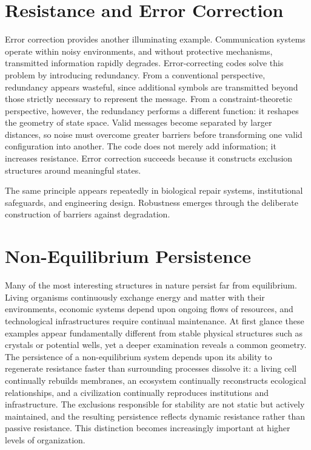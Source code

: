 \documentclass[11pt,oneside]{book}
\theoremstyle{plain}
\theoremstyle{definition}
\theoremstyle{remark}
\begin{document}
\section{Resistance and Error Correction}

Error correction provides another illuminating example. Communication systems operate within noisy environments, and without protective mechanisms, transmitted information rapidly degrades. Error-correcting codes solve this problem by introducing redundancy. From a conventional perspective, redundancy appears wasteful, since additional symbols are transmitted beyond those strictly necessary to represent the message. From a constraint-theoretic perspective, however, the redundancy performs a different function: it reshapes the geometry of state space. Valid messages become separated by larger distances, so noise must overcome greater barriers before transforming one valid configuration into another. The code does not merely add information; it increases resistance. Error correction succeeds because it constructs exclusion structures around meaningful states.

The same principle appears repeatedly in biological repair systems, institutional safeguards, and engineering design. Robustness emerges through the deliberate construction of barriers against degradation.

\section{Non-Equilibrium Persistence}

Many of the most interesting structures in nature persist far from equilibrium. Living organisms continuously exchange energy and matter with their environments, economic systems depend upon ongoing flows of resources, and technological infrastructures require continual maintenance. At first glance these examples appear fundamentally different from stable physical structures such as crystals or potential wells, yet a deeper examination reveals a common geometry. The persistence of a non-equilibrium system depends upon its ability to regenerate resistance faster than surrounding processes dissolve it: a living cell continually rebuilds membranes, an ecosystem continually reconstructs ecological relationships, and a civilization continually reproduces institutions and infrastructure. The exclusions responsible for stability are not static but actively maintained, and the resulting persistence reflects dynamic resistance rather than passive resistance. This distinction becomes increasingly important at higher levels of organization.
\end{document}
